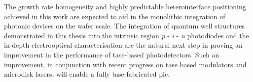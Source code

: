The growth rate homogeneity and highly predictable heterointerface positioning achieved in this work are expected to aid in the monolithic integration of photonic devices on the wafer scale. The integration of quantum well structures demonstrated in this thesis into the intrinsic region \textit{p} - \textit{i} - \textit{n} photodiodes and the in-depth electrooptical characterisation are the natural next step in proving an improvement in the performance of \acs{tase}-based photodetectors. Such an improvement, in conjunction with recent progress on \acs{tase} based modulators and microdisk lasers, will enable a fully \acs{tase}-fabricated \acs{pic}.